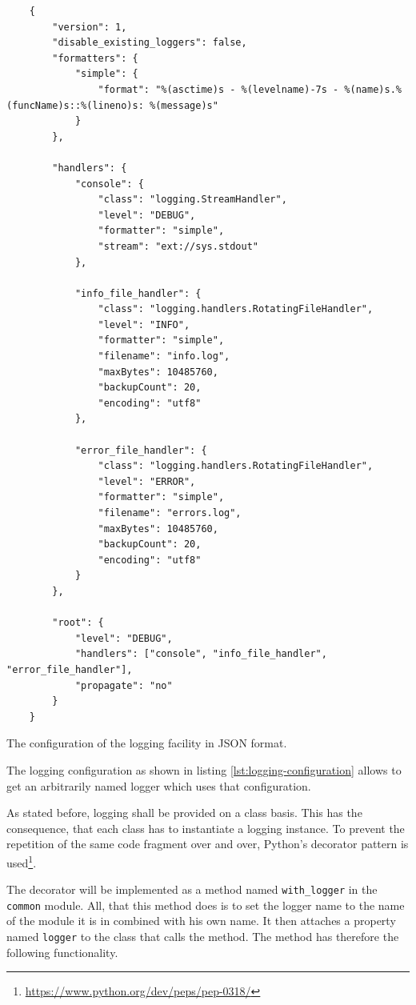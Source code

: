 \documentclass[10pt, openright, notitlepage]{scrreprt}
\begin{document}
\begin{listing}[H]
\begin{verbatim}
    {
        "version": 1,
        "disable_existing_loggers": false,
        "formatters": {
            "simple": {
                "format": "%(asctime)s - %(levelname)-7s - %(name)s.%(funcName)s::%(lineno)s: %(message)s"
            }
        },
    
        "handlers": {
            "console": {
                "class": "logging.StreamHandler",
                "level": "DEBUG",
                "formatter": "simple",
                "stream": "ext://sys.stdout"
            },
    
            "info_file_handler": {
                "class": "logging.handlers.RotatingFileHandler",
                "level": "INFO",
                "formatter": "simple",
                "filename": "info.log",
                "maxBytes": 10485760,
                "backupCount": 20,
                "encoding": "utf8"
            },
    
            "error_file_handler": {
                "class": "logging.handlers.RotatingFileHandler",
                "level": "ERROR",
                "formatter": "simple",
                "filename": "errors.log",
                "maxBytes": 10485760,
                "backupCount": 20,
                "encoding": "utf8"
            }
        },
    
        "root": {
            "level": "DEBUG",
            "handlers": ["console", "info_file_handler", "error_file_handler"],
            "propagate": "no"
        }
    }
\end{verbatim}
\caption{\label{lst:logging-configuration}
The configuration of the logging facility in JSON format.}
\end{listing}

The logging configuration as shown in listing \ref{lst:logging-configuration} allows
to get an arbitrarily named logger which uses that configuration.

As stated before, logging shall be provided on a class basis. This has the
consequence, that each class has to instantiate a logging instance. To prevent
the repetition of the same code fragment over and over, Python's decorator
pattern is used\footnote{\url{https://www.python.org/dev/peps/pep-0318/}}.

The decorator will be implemented as a method named \texttt{with\_logger} in
the \texttt{common} module. All, that this method does is to set the logger
name to the name of the module it is in combined with his own name. It then
attaches a property named \texttt{logger} to the class that calls the method.
The method has therefore the following functionality.
\end{document}
